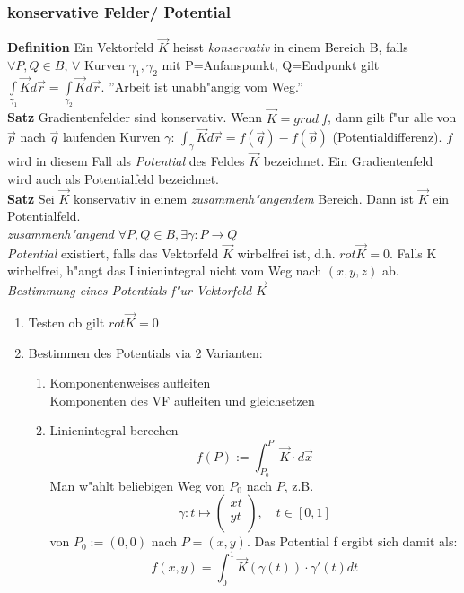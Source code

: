 \documentclass[10pt, a4paper, twocolumn]{scrartcl}
\begin{document}
\subsubsection{konservative Felder/ Potential}

\textbf{Definition} Ein Vektorfeld $\vec{K}$ heisst \textit{konservativ} in einem Bereich B, falls $\forall P,Q\in B$, $\forall$ Kurven $\gamma_1,\gamma_2$ mit P=Anfanspunkt, Q=Endpunkt gilt $\int\limits_{\gamma_1}\vec{K}d\vec{r}=\int\limits_{\gamma_2}\vec{K}d\vec{r}$. ''Arbeit ist unabh"angig vom Weg.''\\

\textbf{Satz} Gradientenfelder sind konservativ.  Wenn $\vec{K}=grad\:f$, dann gilt f"ur alle von $\vec{p}$ nach $\vec{q}$ laufenden Kurven $\gamma$: $\int_\gamma\vec{K}d\vec{r}=f(\vec{q})-f(\vec{p})$ (Potentialdifferenz). $f$ wird in diesem Fall als \textit{Potential} des Feldes $\vec{K}$ bezeichnet. Ein Gradientenfeld wird auch als Potentialfeld bezeichnet.\\

\textbf{Satz} Sei $\vec{K}$ konservativ in einem \textit{zusammenh"angendem} Bereich. Dann ist $\vec{K}$ ein Potentialfeld.\\

\textit{zusammenh"angend} $\forall P,Q\in B,\exists\gamma: P\rightarrow Q$\\


\textit{Potential} existiert, falls das Vektorfeld $\vec{K}$ wirbelfrei ist, d.h. $rot \vec{K}=0$. Falls K wirbelfrei, h"angt das Linienintegral nicht vom Weg nach $(x,y,z)$ ab.\\

\textit{Bestimmung eines Potentials f"ur Vektorfeld $\vec{K}$}
\begin{enumerate}
 \item Testen ob gilt $rot \vec{K}=0$
 \item Bestimmen des Potentials via 2 Varianten:
  \begin{enumerate}
   \item Komponentenweises aufleiten\\
    Komponenten des VF aufleiten und gleichsetzen
   \item Linienintegral berechen\\
    $$f(P):=\int^P_{P_0}\vec{K}\cdotp d\vec{x}$$
    Man w"ahlt beliebigen Weg von $P_0$ nach $P$, z.B.
    $$\gamma: t\mapsto\left (\begin{array}{c} xt\\ yt\\ \end{array}\right ),\quad t\in[0,1]$$
    von $P_0:=(0,0)$ nach $P=(x,y)$. Das Potential f ergibt sich damit als:
    $$f(x,y)=\int^1_0 \vec{K}(\gamma(t))\cdotp \gamma '(t)dt$$
  \end{enumerate}
\end{enumerate}
\end{document}
